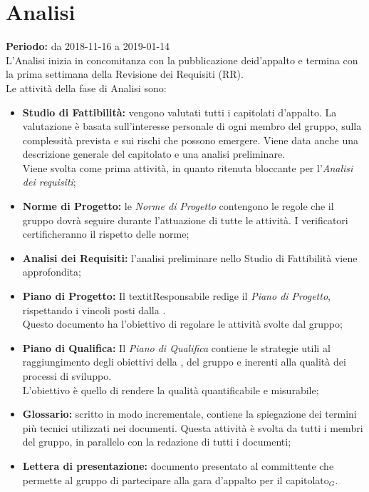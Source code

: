 \section{Analisi}
\textbf{Periodo:} da 2018-11-16 a 2019-01-14\\L'Analisi inizia in concomitanza con la pubblicazione deid’appalto e termina con la prima settimana della  Revisione dei Requisiti (RR).\\
Le attività della fase di Analisi sono:
\begin{itemize}
    \item \textbf{Studio di Fattibilità:} vengono valutati tutti i capitolati d'appalto. La valutazione è basata sull'interesse personale di ogni membro del gruppo, sulla complessità prevista e sui rischi che possono emergere. Viene data anche una descrizione generale del capitolato e una analisi preliminare.\\Viene svolta come prima attività, in quanto ritenuta bloccante per l'\textit{Analisi dei requisiti};
    \item \textbf{Norme di Progetto:} le \textit{Norme di Progetto} contengono le regole che il gruppo dovrà seguire durante l'attuazione di tutte le attività. I verificatori certificheranno il rispetto delle norme;
    \item \textbf{Analisi dei Requisiti:} l'analisi preliminare nello Studio di Fattibilità viene approfondita;
    \item \textbf{Piano di Progetto:} Il textit{Responsabile} redige il \textit{Piano di Progetto}, rispettando i vincoli posti dalla .\\Questo documento ha l'obiettivo di regolare le attività svolte dal gruppo;
    \item \textbf{Piano di Qualifica:} Il \textit{Piano di Qualifica} contiene le strategie utili al raggiungimento degli obiettivi della , del gruppo e inerenti alla qualità dei processi di sviluppo.\\L'obiettivo è quello di rendere la qualità quantificabile e misurabile;
    \item \textbf{Glossario:} scritto in modo incrementale, contiene la spiegazione dei termini più tecnici utilizzati nei documenti. Questa attività è svolta da tutti i membri del gruppo, in parallelo con la redazione di tutti i documenti;
    \item \textbf{Lettera di presentazione:} documento presentato al committente che permette al gruppo di partecipare alla gara d’appalto per il capitolato$_{G}$.
\end{itemize}
